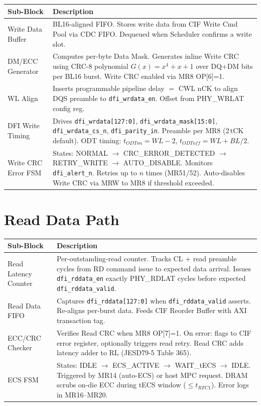 \documentclass[10pt,a4paper]{article}
\newcommand{\Th}[1]{\cellcolor{cellbg}\textbf{\small #1}}
\newcommand{\RA}{\rowcolor{white}}
\newcommand{\RB}{\rowcolor{altbg}}
\begin{document}
\begin{center}
\begin{tabularx}{\linewidth}{@{} l X @{}}
\toprule
\Th{Sub-Block} & \Th{Description} \\
\midrule
\RA Write Data Buffer & BL16-aligned FIFO. Stores write data from CIF Write Cmd Pool via CDC FIFO.
  Dequeued when Scheduler confirms a write slot. \\
\RB DM/ECC Generator & Computes per-byte Data Mask. Generates inline Write CRC using CRC-8
  polynomial $G(x) = x^4 + x + 1$ over DQ+DM bits per BL16 burst.
  Write CRC enabled via MR8 OP[6]=1. \\
\RA WL Align & Inserts programmable pipeline delay $=$ CWL nCK to align DQS preamble to
  \texttt{dfi\_wrdata\_en}. Offset from PHY\_WRLAT config reg. \\
\RB DFI Write Timing & Drives \texttt{dfi\_wrdata[127:0]}, \texttt{dfi\_wrdata\_mask[15:0]},
  \texttt{dfi\_wrdata\_cs\_n}, \texttt{dfi\_parity\_in}. Preamble per MR8 (2\,tCK default).
  ODT timing: $t_{ODTon}=WL-2$, $t_{ODToff}=WL+BL/2$. \\
\RA Write CRC Error FSM & States: NORMAL $\to$ CRC\_ERROR\_DETECTED $\to$ RETRY\_WRITE $\to$
  AUTO\_DISABLE. Monitors \texttt{dfi\_alert\_n}. Retries up to $n$ times (MR51/52).
  Auto-disables Write CRC via MRW to MR8 if threshold exceeded. \\
\bottomrule
\end{tabularx}
\end{center}

\section{Read Data Path}

\begin{center}
\begin{tabularx}{\linewidth}{@{} l X @{}}
\toprule
\Th{Sub-Block} & \Th{Description} \\
\midrule
\RA Read Latency Counter & Per-outstanding-read counter. Tracks CL + read preamble cycles from
  RD command issue to expected data arrival. Issues \texttt{dfi\_rddata\_en} exactly
  PHY\_RDLAT cycles before expected \texttt{dfi\_rddata\_valid}. \\
\RB Read Data FIFO & Captures \texttt{dfi\_rddata[127:0]} when \texttt{dfi\_rddata\_valid}
  asserts. Re-aligns per-burst data. Feeds CIF Reorder Buffer with AXI transaction tag. \\
\RA ECC/CRC Checker & Verifies Read CRC when MR8 OP[7]=1. On error: flags to CIF error register,
  optionally triggers read retry. Read CRC adds latency adder to RL (JESD79-5 Table 365). \\
\RB ECS FSM & States: IDLE $\to$ ECS\_ACTIVE $\to$ WAIT\_tECS $\to$ IDLE. Triggered by
  MR14 (auto-ECS) or host MPC request. DRAM scrubs on-die ECC during tECS window
  ($\leq t_{RFC1}$). Error logs in MR16--MR20. \\
\bottomrule
\end{tabularx}
\end{center}
\end{document}
